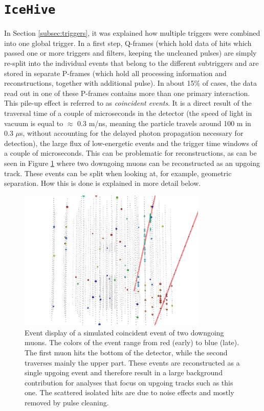 \section{\texttt{IceHive}}
\label{sec:icehive}
In Section \ref{subsec:triggers}, it was explained how multiple triggers were combined into one global trigger. In a first step, Q-frames (which hold data of hits which passed one or more triggers and filters, keeping the uncleaned pulses) are simply re-split into the individual events that belong to the different subtriggers and are stored in separate P-frames (which hold all processing information and reconstructions, together with additional pulse). In about 15\% of cases, the data read out in one of these P-frames contains more than one primary interaction. This pile-up effect is referred to as \textit{coincident events}. It is a direct result of the traversal time of a couple of microseconds in the detector (the speed of light in vacuum is equal to $\approx$ 0.3 m/ns, meaning the particle travels around 100 m in 0.3 $\mu$s, without accounting for the delayed photon propagation necessary for detection), the large flux of low-energetic events and the trigger time windows of a couple of microseconds. This can be problematic for reconstructions, as can be seen in Figure \ref{fig:coincidentevent} where two downgoing muons can be reconstructed as an upgoing track. These events can be split when looking at, for example, geometric separation. How this is done is explained in more detail below.\\

\begin{figure}[t]
\centering
\includegraphics[width=0.8\textwidth]{chapter7/img/coincidenteventsCORS.png}
\caption{Event display of a simulated coincident event of two downgoing muons. The colors of the event range from red (early) to blue (late). The first muon hits the bottom of the detector, while the second traverses mainly the upper part. These events are reconstructed as a single upgoing event and therefore result in a large background contribution for analyses that focus on upgoing tracks such as this one. The scattered isolated hits are due to noise effects and mostly removed by pulse cleaning.}
\label{fig:coincidentevent}
\end{figure}

